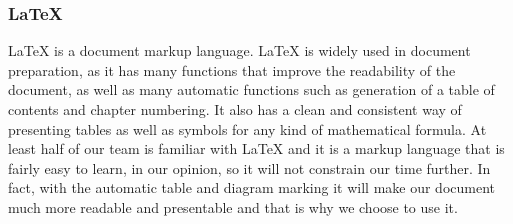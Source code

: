 \documentclass[../document.tex]{subfiles}
\begin{document}
\subsubsection{LaTeX}
LaTeX is a document markup language. LaTeX is widely used in document preparation, as it has many functions that improve the readability of the document, as well as many automatic functions such as generation of a table of contents and chapter numbering. It also has a clean and consistent way of presenting tables as well as symbols for any kind of mathematical formula. At least half of our team is familiar with LaTeX and it is a markup language that is fairly easy to learn, in our opinion, so it will not constrain our time further. In fact, with the automatic table and diagram marking it will make our document much more readable and presentable and that is why we choose to use it.
\end{document}
